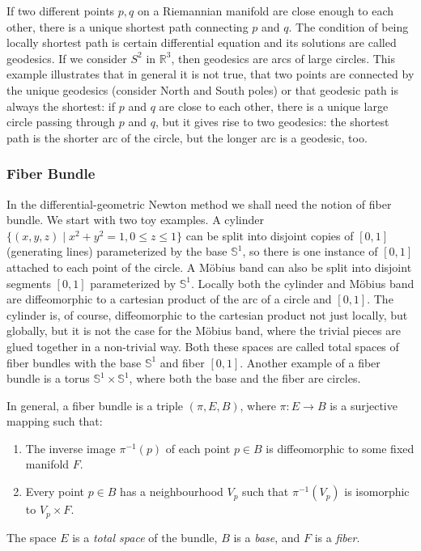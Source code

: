 If two different points $p, q$ on a Riemannian manifold are close enough to each other,
there is a unique shortest path connecting $p$ and $q$. 
The condition of being locally shortest path is certain differential equation
and its solutions are called geodesics. If we consider $S^2$ in $\mathbb{R}^3$, 
then geodesics are arcs of large circles. This example illustrates that in general it is not true,
that two points are connected by the unique geodesics (consider North and South poles)
or that geodesic path is always the shortest: if $p$ and $q$ are close to each other,
there is a unique large circle passing through $p$ and $q$, but it gives rise to two
geodesics: the shortest path is the shorter arc of the circle, but the longer arc 
is a geodesic, too.


\subsubsection{Fiber Bundle}

In the differential-geometric Newton method
we shall need the notion of fiber bundle.
We start with two toy examples.
A cylinder $ \{ (x, y, z) \mid x^2 + y^2 = 1, 0 \leq z \leq 1 \}$
can be split into disjoint copies of $[0,1]$ (generating lines)
parameterized by the base $\mathbb{S}^1$,
so there is one instance of $[0,1]$ attached to each point of the circle.
A M\"obius band can also be split into disjoint segments
$[0,1]$ parameterized by $\mathbb{S}^1$. Locally both the cylinder
and M\"obius band are diffeomorphic to a cartesian product
of the arc of a circle and $[0,1]$. The cylinder is, of course,
diffeomorphic to the cartesian product not just locally, but globally,
but it is not the case for the M\"obius band, where the trivial
 pieces are glued together in a non-trivial way. Both these spaces
are called total spaces of fiber bundles with the base $\mathbb{S}^1$ and fiber $[0,1]$.
Another example of a fiber bundle is a torus $\mathbb{S}^1 \times \mathbb{S}^1$,
where both the base and the fiber are circles. 

In general, a fiber bundle is a triple $( \pi, E, B)$, where
$ \pi \colon E \to B$ is a surjective mapping such that:
\begin{enumerate}
    \item The inverse image $\pi^{-1}(p)$ of each point $p \in B$ is 
    diffeomorphic to some fixed manifold $F$.
    \item Every point $p \in B$ has a neighbourhood $V_p$
    such that $\pi^{-1}(V_p)$ is isomorphic to $V_p \times F$.
\end{enumerate}
    The space $E$ is a \textit{total space} of the bundle, $B$ is a \textit{base}, and $F$ is a \textit{fiber}.


